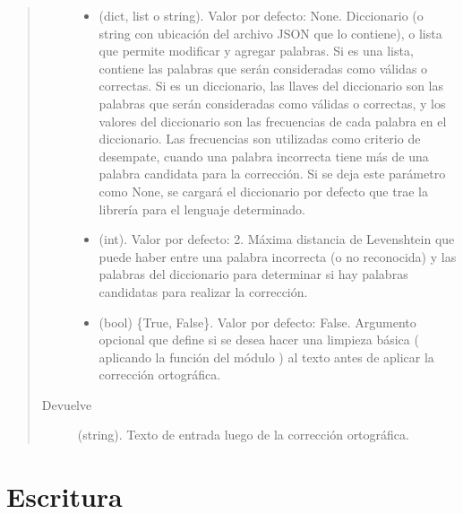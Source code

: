 \documentclass[letterpaper,10pt,openany,spanish]{sphinxmanual}
\begin{document}
\begin{fulllineitems}
\begin{quote}
\begin{description}
\begin{itemize}
\item {} 
 \textendash{} (dict, list o string). Valor por defecto: None. Diccionario (o string con ubicación del         archivo JSON que lo contiene), o lista que permite modificar y agregar palabras.         Si es una lista, contiene las palabras que serán consideradas como válidas o correctas.         Si es un diccionario, las llaves del diccionario son las palabras que serán consideradas
como válidas o correctas, y los valores del diccionario son las frecuencias de cada palabra         en el diccionario. Las frecuencias son utilizadas como criterio de desempate, cuando una         palabra incorrecta tiene más de una palabra candidata para la corrección. Si se deja este         parámetro como None, se cargará el diccionario por defecto que trae la librería          para el lenguaje determinado.

\item {} 
 \textendash{} (int). Valor por defecto: 2. Máxima distancia de Levenshtein que puede haber         entre una palabra incorrecta (o no reconocida) y las palabras del diccionario para         determinar si hay palabras candidatas para realizar la corrección.

\item {} 
 \textendash{} (bool) \{True, False\}. Valor por defecto: False. Argumento         opcional que define si se desea hacer una limpieza básica (        aplicando la función  del módulo ) al         texto antes de aplicar la corrección ortográfica.

\end{itemize}

\item[{Devuelve}] \leavevmode
(string). Texto de entrada luego de la corrección ortográfica.

\end{description}\end{quote}

\end{fulllineitems}



\chapter{Escritura}
\label{\detokenize{funciones/escritura:module-escritura}}\label{\detokenize{funciones/escritura:escritura}}\label{\detokenize{funciones/escritura::doc}}
\end{document}
